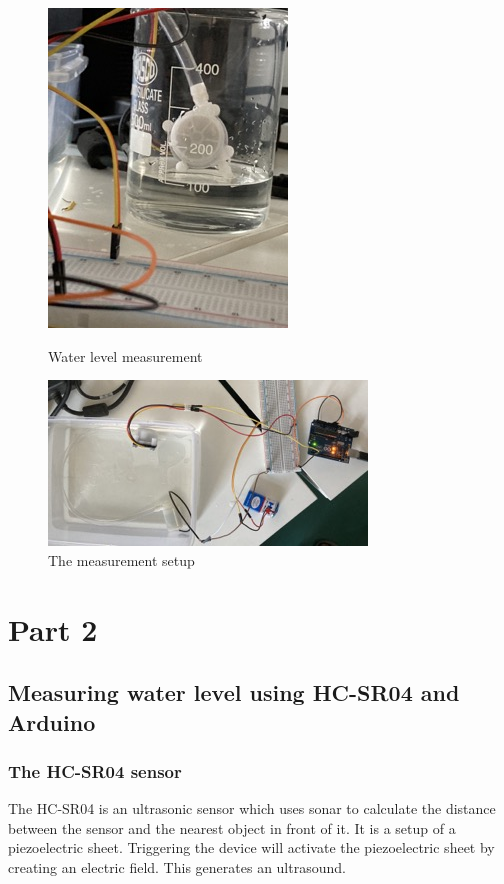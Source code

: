 \documentclass[12pt]{article}
\begin{document}
\begin{figure}[h!]
\begin{minipage}{.5\textwidth}
\centering
\includegraphics[scale=0.5]{water beaker.jpeg}
\caption{Water level measurement}
\label{fig:awesome_image2}
\end{minipage}%
\begin{minipage}{.5\textwidth}
\centering
\includegraphics[scale=0.6]{water circuit.jpeg}
\caption{The measurement setup}
\label{fig:awesome_image3}
\end{minipage}
\end{figure}

\section*{Part 2}
\subsection*{Measuring water level using HC-SR04 and Arduino}
\subsubsection*{The HC-SR04 sensor}
The HC-SR04 is an ultrasonic sensor which uses sonar to calculate the distance between the sensor and the nearest object in front of it.  It is a setup of a piezoelectric sheet. Triggering the device will activate the piezoelectric sheet by creating an electric field. This generates an ultrasound. 
\end{document}
